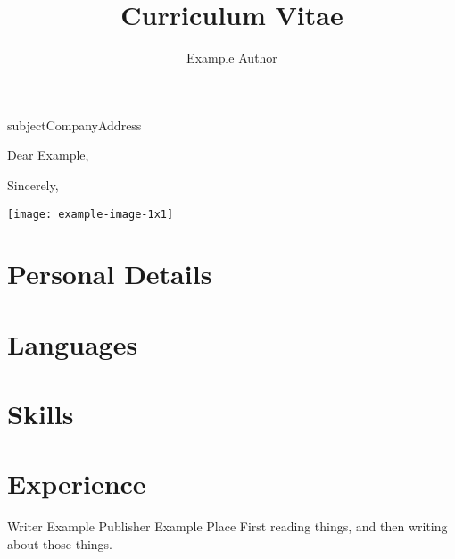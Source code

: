 \documentclass[
  xcolor=dvipsnames,
  primary=Fuchsia,
  biblatex,
  signcv,
  14pt,a4paper
]{polycv}
\title{Curriculum Vitae}
\author{Example Author}
\begin{document}
\begin{polycvletter}[\polycvaddress\\\polycvmobile\\\polycvemail]{subject}{Company\newline Address}
  \opening{Dear Example,}

  \blindtext[1-3]

  \closing{Sincerely,}
\end{polycvletter}
\begin{polycvfirstpage}
  \nocite{*}%
  \begin{polycvsidebar}
  
  \texttt{[image: example-image-1x1]}\\[2ex]
  
  \section{Personal Details}
  \polycvlineaddress
  \polycvlineemail
  \polycvlinephone
  \polycvlinemobile
  \polycvlineorcid
  \polycvlinegithub
  \null
  
  \section{Languages}
  
  \section{Skills}
  
  \end{polycvsidebar}%
  \section{Experience}
  {Writer}
  {Example Publisher}
  {Example Place}
  {}
  {First reading things, and then writing about those things.}
  

\end{polycvfirstpage}
\end{document}
